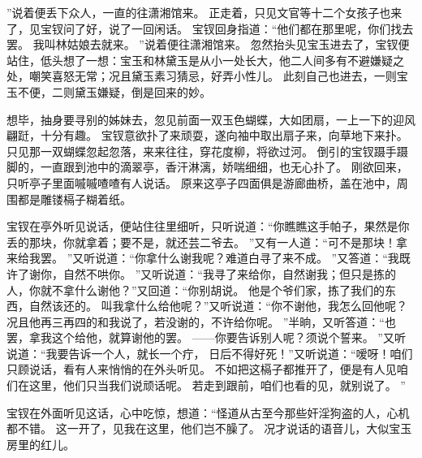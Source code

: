 ”说着便丢下众人，一直的往潇湘馆来。
正走着，只见文官等十二个女孩子也来了，见宝钗问了好，说了一回闲话。
宝钗回身指道：“他们都在那里呢，你们找去罢。
我叫林姑娘去就来。
”说着便往潇湘馆来。
忽然抬头见宝玉进去了，宝钗便站住，低头想了一想：宝玉和林黛玉是从小一处长大，他二人间多有不避嫌疑之处，嘲笑喜怒无常；况且黛玉素习猜忌，好弄小性儿。
此刻自己也进去，一则宝玉不便，二则黛玉嫌疑，倒是回来的妙。
\par
想毕，抽身要寻别的姊妹去，忽见前面一双玉色蝴蝶，大如团扇，一上一下的迎风翩跹，十分有趣。
宝钗意欲扑了来顽耍，遂向袖中取出扇子来，向草地下来扑。
只见那一双蝴蝶忽起忽落，来来往往，穿花度柳，将欲过河。
倒引的宝钗蹑手蹑脚的，一直跟到池中的滴翠亭，香汗淋漓，娇喘细细，也无心扑了。
刚欲回来，只听亭子里面嘁嘁喳喳有人说话。
原来这亭子四面俱是游廊曲桥，盖在池中，周围都是雕镂槅子糊着纸。
\par
{}
宝钗在亭外听见说话，便站住往里细听，只听说道：“你瞧瞧这手帕子，果然是你丢的那块，你就拿着；要不是，就还芸二爷去。
”又有一人道：“可不是那块！拿来给我罢。
”又听说道：“你拿什么谢我呢？难道白寻了来不成。
”又答道：“我既许了谢你，自然不哄你。
”又听说道：“我寻了来给你，自然谢我；但只是拣的人，你就不拿什么谢他？”又回道：“你别胡说。
他是个爷们家，拣了我们的东西，自然该还的。
叫我拿什么给他呢？”又听说道：“你不谢他，我怎么回他呢？况且他再三再四的和我说了，若没谢的，不许给你呢。
”半晌，又听答道：“也罢，拿我这个给他，就算谢他的罢。
——你要告诉别人呢？须说个誓来。
”又听说道：“我要告诉一个人，就长一个疔，
日后不得好死！”又听说道：“嗳呀！咱们只顾说话，看有人来悄悄的在外头听见。
不如把这槅子都推开了，便是有人见咱们在这里，他们只当我们说顽话呢。
若走到跟前，咱们也看的见，就别说了。
”\par
宝钗在外面听见这话，心中吃惊，想道：“怪道从古至今那些奸淫狗盗的人，心机都不错。
这一开了，见我在这里，他们岂不臊了。
况才说话的语音儿，大似宝玉房里的红儿。
